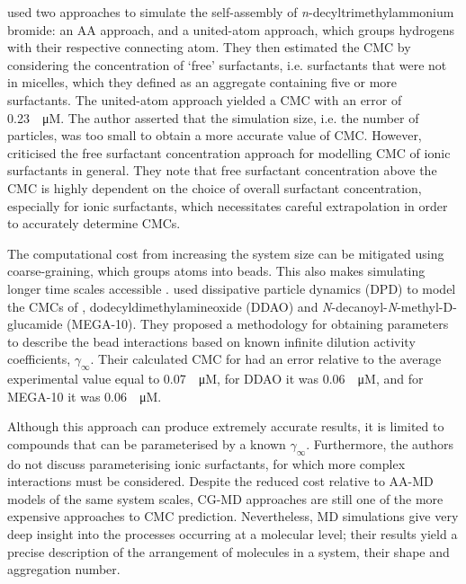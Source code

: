 \citet{jorgeMolecularDynamicsSimulation2008} used two approaches to simulate the
self-assembly of \textit{n}-decyltrimethylammonium bromide: an AA approach, and
a united-atom approach, which groups hydrogens with their respective connecting
atom. They then estimated the CMC by considering the concentration of `free'
surfactants, i.e. surfactants that were not in micelles, which they defined as
an aggregate containing five or more surfactants. The united-atom approach
yielded a CMC with an error of \SI{0.23}{\log \micro M}. The author asserted
that the simulation size, i.e. the number of particles, was too small to obtain
a more accurate value of CMC. However,
\citet{jusufiExplicitImplicitSolventSimulations2015} criticised the free
surfactant concentration approach for modelling CMC of ionic surfactants in
general. They note that free surfactant concentration above the CMC is highly
dependent on the choice of overall surfactant concentration, especially for
ionic surfactants, which necessitates careful extrapolation in order to
accurately determine CMCs.

The computational cost from increasing the system size can be mitigated using
coarse-graining, which groups atoms into beads. This also makes simulating
longer time scales accessible
\cite{fitzgeraldMultiscaleModelingNanomaterials2015}.
\citet{vishnyakovPredictionCriticalMicelle2013} used dissipative particle
dynamics (DPD) to model the CMCs of , dodecyldimethylamineoxide (DDAO)
and \textit{N}-decanoyl-\textit{N}-methyl-\textsc{D}-glucamide (MEGA-10). They
proposed a methodology for obtaining parameters to describe the bead
interactions based on known infinite dilution activity coefficients,
$\gamma_\infty$. Their calculated CMC for  had an error relative to the
average experimental value equal to \SI{0.07}{\log \micro M}, for DDAO it was
\SI{0.06}{\log \micro M}, and for MEGA-10 it was \SI{0.06}{\log \micro M}.

Although this approach can produce extremely accurate results, it is limited to
compounds that can be parameterised by a known $\gamma_\infty$. Furthermore, the
authors do not discuss parameterising ionic surfactants, for which more complex
interactions must be considered. Despite the reduced cost relative to AA-MD
models of the same system scales, CG-MD approaches are still one of the more
expensive approaches to CMC prediction. Nevertheless, MD simulations give very
deep insight into the processes occurring at a molecular level; their results
yield a precise description of the arrangement of molecules in a system, their
shape and aggregation number.

